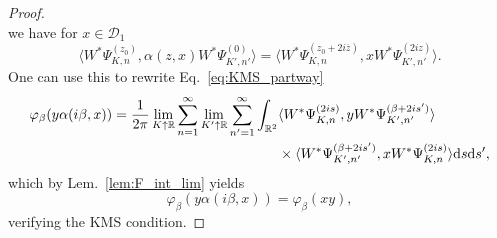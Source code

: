 \documentclass[sn-mathphys-num]{sn-jnl}%
\newcommand{\RR}{\mathbb{R}}
\newcommand{\diff}{\textup{d}}
\numberwithin{equation}{section}
\theoremstyle{thmstyleone}%
\theoremstyle{thmstyletwo}%
\theoremstyle{thmstylethree}%
\begin{document}
\begin{proof}
\begin{equation}
\end{equation}
we have for $x\in\mathcal{D}_1$
\begin{equation}
   \langle W^*\Psi_{K,n}^{(z_0)}, \alpha(z,x) W^*\Psi_{K',n'}^{(0)}\rangle=\langle W^*\Psi_{K,n}^{(z_0+2i\overline{z})},x W^*\Psi_{K',n'}^{(2iz)}\rangle.
\end{equation}
One can use this to rewrite Eq.~\eqref{eq:KMS_partway}
\begin{align}
    \varphi_\beta(y\alpha(i\beta,x))=\frac{1}{2\pi}\lim_{K\uparrow\RR}\sum_{n=1}^\infty \lim_{K'\uparrow\RR}\sum_{n'=1}^\infty\int_{\RR^2}& \langle W^*\Psi_{K,n}^{(2is)},yW^*\Psi_{K',n'}^{(\beta+2is')}\rangle\nonumber\\
    &\times\langle W^*\Psi_{K',n'}^{(\beta+2is')},xW^*\Psi_{K,n}^{(2is)}\rangle\diff s\diff s',
\end{align}
which by Lem.\ \ref{lem:F_int_lim} yields
\begin{equation}
    \varphi_\beta(y\alpha(i\beta,x))=\varphi_\beta(xy),
\end{equation}
verifying the KMS condition.
\end{proof}






%
\end{document}
